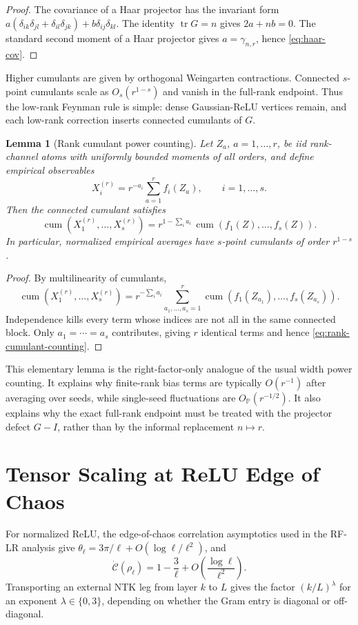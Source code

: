 \documentclass{article}
\newtheorem{lemma}[theorem]{Lemma}
\newcommand{\Pp}{\mathbb P}
\newcommand{\cumul}{\operatorname{cum}}
\newcommand{\tr}{\operatorname{tr}}
\begin{document}
\begin{proof}
The covariance of a Haar projector has the invariant form \(a(\delta_{ik}\delta_{jl}+\delta_{il}\delta_{jk})+b\delta_{ij}\delta_{kl}\). The identity \(\tr G=n\) gives \(2a+nb=0\). The standard second moment of a Haar projector gives \(a=\gamma_{n,r}\), hence \eqref{eq:haar-cov}.
\end{proof}

Higher cumulants are given by orthogonal Weingarten contractions. Connected \(s\)-point cumulants scale as \(O_s(r^{1-s})\) and vanish in the full-rank endpoint. Thus the low-rank Feynman rule is simple: dense Gaussian-ReLU vertices remain, and each low-rank correction inserts connected cumulants of \(G\).

\begin{lemma}[Rank cumulant power counting]
\label{lem:rank-cumulant-counting}
Let \(Z_a\), \(a=1,\ldots,r\), be iid rank-channel atoms with uniformly bounded moments of all orders, and define empirical observables
\[
X_i^{(r)}=r^{-a_i}\sum_{a=1}^{r} f_i(Z_a),
\qquad i=1,\ldots,s.
\]
Then the connected cumulant satisfies
\begin{equation}
\cumul\left(X_1^{(r)},\ldots,X_s^{(r)}\right)
=r^{1-\sum_i a_i}\,
\cumul\left(f_1(Z),\ldots,f_s(Z)\right).
\label{eq:rank-cumulant-counting}
\end{equation}
In particular, normalized empirical averages have \(s\)-point cumulants of order \(r^{1-s}\).
\end{lemma}

\begin{proof}
By multilinearity of cumulants,
\[
\cumul(X_1^{(r)},\ldots,X_s^{(r)})
=r^{-\sum_i a_i}
\sum_{a_1,\ldots,a_s=1}^{r}
\cumul(f_1(Z_{a_1}),\ldots,f_s(Z_{a_s})).
\]
Independence kills every term whose indices are not all in the same connected block. Only \(a_1=\cdots=a_s\) contributes, giving \(r\) identical terms and hence \eqref{eq:rank-cumulant-counting}.
\end{proof}

This elementary lemma is the right-factor-only analogue of the usual width power counting. It explains why finite-rank bias terms are typically \(O(r^{-1})\) after averaging over seeds, while single-seed fluctuations are \(O_{\Pp}(r^{-1/2})\). It also explains why the exact full-rank endpoint must be treated with the projector defect \(G-I\), rather than by the informal replacement \(n\mapsto r\).

\section{Tensor Scaling at ReLU Edge of Chaos}
For normalized ReLU, the edge-of-chaos correlation asymptotics used in the RF-LR analysis \citep{RFLR2026} give
\(\theta_\ell=3\pi/\ell+O(\log \ell/\ell^2)\), and
\begin{equation}
\dot{\mathcal C}(\rho_\ell)=1-\frac3\ell+O\left(\frac{\log\ell}{\ell^2}\right).
\label{eq:relu-transport}
\end{equation}
Transporting an external NTK leg from layer \(k\) to \(L\) gives the factor \((k/L)^\lambda\) for an exponent \(\lambda\in\{0,3\}\), depending on whether the Gram entry is diagonal or off-diagonal.
\end{document}
